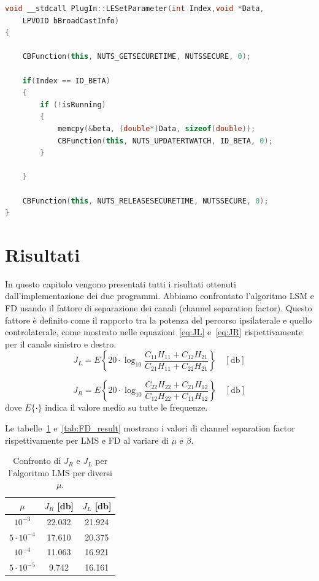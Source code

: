 \documentclass[12pt,a4paper,titlepage]{article}
\begin{document}
\begin{lstlisting}[language=cpp, label=code:set_rtwatch_fd, caption = Funzione \texttt{LESetParameter}, breaklines = false, captionpos = b]
void __stdcall PlugIn::LESetParameter(int Index,void *Data,
	LPVOID bBroadCastInfo)
{

	CBFunction(this, NUTS_GETSECURETIME, NUTSSECURE, 0);

	if(Index == ID_BETA)
	{
		if (!isRunning)
		{
			memcpy(&beta, (double*)Data, sizeof(double));
			CBFunction(this, NUTS_UPDATERTWATCH, ID_BETA, 0);
		}
		
	}

	CBFunction(this, NUTS_RELEASESECURETIME, NUTSSECURE, 0);
}
\end{lstlisting}
\clearpage

\section{Risultati}
\label{sec:risultati}
In questo capitolo vengono presentati tutti i risultati ottenuti dall'implementazione dei due programmi. Abbiamo confrontato l'algoritmo LSM e FD usando il fattore di separazione dei canali (channel separation factor). Questo fattore è definito come il rapporto tra la potenza del percorso ipsilaterale e quello controlaterale, come mostrato nelle equazioni~\eqref{eq:JL} e~\eqref{eq:JR} rispettivamente per il canale sinistro e destro.
\begin{equation}\label{eq:JL}
J_L = E\left\{20\cdot\log_{10} \dfrac{C_{11}H_{11}+C_{12}H_{21}}{C_{21}H_{11}+C_{22}H_{21}}\right\} \quad [\si{\decibel}]
\end{equation}

\begin{equation}\label{eq:JR}
J_R = E\left\{20\cdot\log_{10} \dfrac{C_{22}H_{22}+C_{21}H_{12}}{C_{12}H_{22}+C_{11}H_{12}}\right\} \quad [\si{\decibel}]
\end{equation}
dove $E\{\cdot\}$ indica il valore medio su tutte le frequenze.

Le tabelle~\ref{tab:LMS_result} e~\ref{tab:FD_result} mostrano i valori di channel separation factor rispettivamente per LMS e FD al variare di $\mu$ e $\beta$.

\begin{table}[h]
\centering
\begin{tabular}{c c c}
\toprule
$\mu$   & $J_R$ [\si{\decibel}]   & $J_L$ [\si{\decibel}]   \\ \midrule
$10^{-3}$ & 22.032 & 21.924 \\
$5\cdot10^{-4}$ & 17.610 & 20.375 \\
$10^{-4}$& 11.063 & 16.921 \\
$5\cdot10^{-5}$ & 9.742  & 16.161 \\ \bottomrule
\end{tabular}
\caption{\label{tab:LMS_result}Confronto di $J_R$ e $J_L$ per l'algoritmo LMS per diversi $\mu$.}
\end{table}
\end{document}
